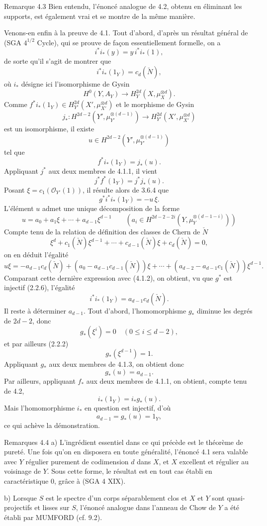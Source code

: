 \begin{statement}{Remarque 4.3}
Bien entendu, l'énoncé analogue de 4.2, obtenu en éliminant les supports, est également vrai et se montre de la même manière.
\end{statement}

Venons-en enfin à la preuve de 4.1. Tout d'abord, d'après un résultat général de (SGA $4^{1/2}$ Cycle), qui se prouve de façon essentiellement formelle, on a
\[
i^*i_*(y)=y\,i^*i_*(1),
\]
de sorte qu'il s'agit de montrer que
\[
i^*i_*(1_Y)=c_d(\check N),
\]
où $i_*$ désigne ici l'isomorphisme de Gysin
\[
H^0(Y,A_Y)\to H_Y^{2d}(X,\mu_X^{\otimes d}).
\]
Comme $f^*i_*(1_Y)\in H_{Y'}^{2d}(X',\mu_{X'}^{\otimes d})$ et le morphisme de Gysin
\[
j_*:H^{2d-2}(Y',\mu_{Y'}^{\otimes(d-1)})
\to H_{Y'}^{2d}(X',\mu_{X'}^{\otimes d})
\]
est un isomorphisme, il existe
\[
u\in H^{2d-2}(Y',\mu_{Y'}^{\otimes(d-1)})
\]
tel que
\[
f^*i_*(1_Y)=j_*(u).
\tag{4.1.1}
\]
Appliquant $j^*$ aux deux membres de 4.1.1, il vient
\[
j^*f^*(1_Y)=j^*j_*(u).
\]
Posant $\xi=c_1(\mathcal{O}_{Y'}(1))$, il résulte alors de 3.6.4 que
\[
g^*i^*i_*(1_Y)=-u\,\xi.
\tag{4.1.2}
\]
L'élément $u$ admet une unique décomposition de la forme
\[
u=a_0+a_1\xi+\cdots+a_{d-1}\xi^{d-1}
\qquad
(a_i\in H^{2d-2-2i}(Y,\mu_Y^{\otimes(d-1-i)}))
\tag{4.1.3}
\]
Compte tenu de la relation de définition des classes de Chern de $\check N$
\[
\xi^d+c_1(\check N)\xi^{d-1}+\cdots+c_{d-1}(\check N)\xi+c_d(\check N)=0,
\tag{4.1.4}
\]
on en déduit l'égalité
\[
u\xi=-a_{d-1}c_d(\check N)+(a_0-a_{d-1}c_{d-1}(\check N))\xi
+\cdots+(a_{d-2}-a_{d-1}c_1(\check N))\xi^{d-1}.
\]
Comparant cette dernière expression avec (4.1.2), on obtient, vu que $g^*$ est injectif (2.2.6), l'égalité
\[
i^*i_*(1_Y)=a_{d-1}c_d(\check N).
\tag{4.1.5}
\]
Il reste à déterminer $a_{d-1}$. Tout d'abord, l'homomorphisme $g_*$ diminue les degrés de $2d-2$, donc
\[
g_*(\xi^i)=0\quad(0\le i\le d-2),
\]
et par ailleurs (2.2.2)
\[
g_*(\xi^{d-1})=1.
\]
Appliquant $g_*$ aux deux membres de 4.1.3, on obtient donc
\[
g_*(u)=a_{d-1}.
\tag{4.1.6}
\]
Par ailleurs, appliquant $f_*$ aux deux membres de 4.1.1, on obtient, compte tenu de 4.2,
\[
i_*(1_Y)=i_*g_*(u).
\tag{4.1.7}
\]
Mais l'homomorphisme $i_*$ en question est injectif, d'où
\[
a_{d-1}=g_*(u)=1_Y,
\]
ce qui achève la démonstration.

\begin{statement}{Remarques 4.4}
a) L'ingrédient essentiel dans ce qui précède est le théorème de pureté. Une fois qu'on en disposera en toute généralité, l'énoncé 4.1 sera valable avec $Y$ régulier purement de codimension $d$ dans $X$, et $X$ excellent et régulier au voisinage de $Y$. Sous cette forme, le résultat est en tout cas établi en caractéristique $0$, grâce à (SGA 4 XIX).

b) Lorsque $S$ est le spectre d'un corps séparablement clos et $X$ et $Y$
sont quasi-projectifs et lisses sur $S$, l'énoncé analogue dans l'anneau de Chow de $Y$ a été établi par MUMFORD (cf. 9.2).
\end{statement}

